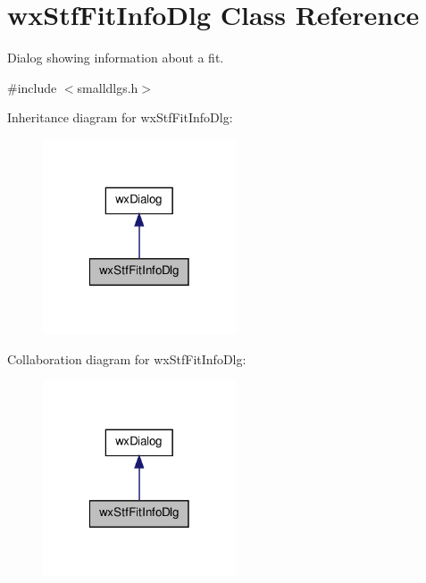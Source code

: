 \hypertarget{classwxStfFitInfoDlg}{
\section{wxStfFitInfoDlg Class Reference}
\label{classwxStfFitInfoDlg}
}


Dialog showing information about a fit.  




{\ttfamily \#include $<$smalldlgs.h$>$}



Inheritance diagram for wxStfFitInfoDlg:
\nopagebreak
\begin{figure}[H]
\begin{center}
\leavevmode
\includegraphics[width=162pt]{classwxStfFitInfoDlg__inherit__graph}
\end{center}
\end{figure}


Collaboration diagram for wxStfFitInfoDlg:
\nopagebreak
\begin{figure}[H]
\begin{center}
\leavevmode
\includegraphics[width=162pt]{classwxStfFitInfoDlg__coll__graph}
\end{center}
\end{figure}

